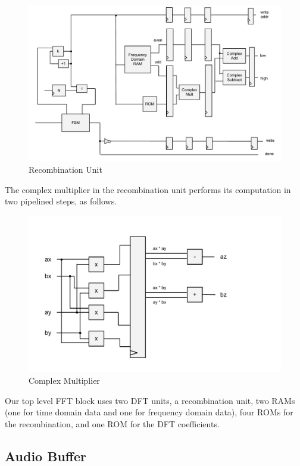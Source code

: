 \documentclass{article}
\begin{document}
	\begin{figure}[H]
		\caption{Recombination Unit}
		\centering
		\includegraphics[scale=0.3]{recombinator}
	\end{figure}

	The complex multiplier in the recombination unit performs its computation
	in two pipelined steps, as follows.

	\begin{figure}[H]
		\caption{Complex Multiplier}
		\includegraphics[scale=0.375]{complex-mult}
	\end{figure}

	Our top level FFT block uses two DFT units, a recombination unit,
	two RAMs (one for time domain data and one for frequency domain data),
	four ROMs for the recombination, and one ROM for the DFT coefficients.
	

\subsection{Audio Buffer}
\end{document}
